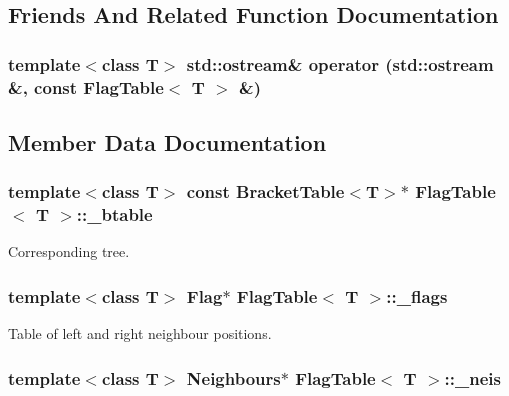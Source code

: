 \subsection{Friends And Related Function Documentation}
\subsubsection{\setlength{\rightskip}{0pt plus 5cm}template$<$class T$>$ std::ostream\& operator (std::ostream \&, const {\bf Flag\-Table}$<$ T $>$ \&)\hspace{0.3cm}{\tt  [friend]}}\label{classFlagTable_n0}




\subsection{Member Data Documentation}
\subsubsection{\setlength{\rightskip}{0pt plus 5cm}template$<$class T$>$ const {\bf Bracket\-Table}$<$T$>$$\ast$ {\bf Flag\-Table}$<$ T $>$::{\bf \_\-btable}\hspace{0.3cm}{\tt  [protected]}}\label{classFlagTable_p4}


Corresponding tree. 

\subsubsection{\setlength{\rightskip}{0pt plus 5cm}template$<$class T$>$ {\bf Flag}$\ast$ {\bf Flag\-Table}$<$ T $>$::{\bf \_\-flags}\hspace{0.3cm}{\tt  [protected]}}\label{classFlagTable_p2}


Table of left and right neighbour positions. 

\subsubsection{\setlength{\rightskip}{0pt plus 5cm}template$<$class T$>$ {\bf Neighbours}$\ast$ {\bf Flag\-Table}$<$ T $>$::{\bf \_\-neis}\hspace{0.3cm}{\tt  [protected]}}\label{classFlagTable_p1}


